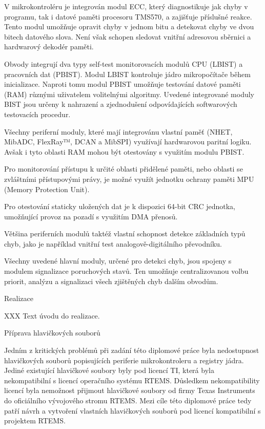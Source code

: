 V mikrokontroléru je integrován modul ECC, který diagnostikuje jak chyby v programu, tak i datové paměti procesoru TMS570, a zajišťuje příslušné reakce.
Tento modul umožňuje opravit chyby v jednom bitu a detekovat chyby ve dvou bitech datového slova.
Není však schopen sledovat vnitřní adresovou sběrnici a hardwarový dekodér paměti.

Obvody integrují dva typy self-test monitorovacích modulů CPU (LBIST) a pracovních dat (PBIST).
Modul LBIST kontroluje jádro mikropočítače během inicializace.
Naproti tomu modul PBIST umožňuje testování datové paměti (RAM) různými uživatelem volitelnými algoritmy.
Uvedené integrované moduly BIST jsou určeny k nahrazení a zjednodušení odpovídajících softwarových testovacích procedur.

Všechny periferní moduly, které mají integrovánu vlastní paměť (NHET, MibADC, FlexRay™, DCAN a MibSPI) využívají hardwarovou paritní logiku.
Avšak i tyto oblasti RAM mohou být otestovány s využitím modulu PBIST.

Pro monitorování přístupu k určité oblasti přidělené paměti, nebo oblasti se zvláštními přístupovými právy, je možné využít jednotku ochrany paměti MPU (Memory Protection Unit).

Pro otestování staticky uložených dat je k dispozici 64-bit CRC jednotka, umožňující provoz na pozadí s využitím DMA přenosů.

Většina periferních modulů taktéž vlastní schopnost detekce základních typů chyb, jako je například vnitřní test analogově-digitálního převodníku.

Všechny uvedené hlavní moduly, určené pro detekci chyb, jsou spojeny s modulem signalizace poruchových stavů.
Ten umožňuje centralizovanou volbu priorit, analýzu a signalizaci všech zjištěných chyb dalším obvodům.



\chap Realizace

XXX Text úvodu do realizace.

\sec Příprava hlavičkových souborů

	Jedním z kritických problémů při zadání této diplomové práce byla nedostupnost hlavičkových souborů popisujících periferie mikrokontroleru a registry jádra.
Jediné existující hlavičkové soubory byly pod licencí TI, která byla nekompatibilní s licencí operačního systému RTEMS.
Důsledkem nekompatibility licencí byla nemožnost přijmout hlavičkové soubory od firmy Texas Instruments do oficiálního vývojového stromu RTEMS.
Mezi cíle této diplomové práce tedy patří návrh a vytvoření vlastních hlavičkových souborů pod licencí kompatibilní s projektem RTEMS.

